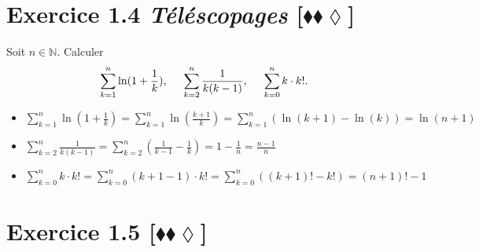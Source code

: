 \documentclass[10pt]{article}
\begin{document}

\section*{Exercice 1.4 \emph{Téléscopages} [$\blacklozenge\blacklozenge\lozenge$]}

\begin{tcolorbox}[enhanced, width=7in, center, size=fbox, fontupper=\large, drop shadow southwest]
    Soit $n\in\mathbb{N}$. Calculer
    \begin{equation*}
        \sum\limits^{n}_{k=1}{\ln(1+\frac{1}{k})}, \hspace{0.5cm} \sum\limits^{n}_{k=2}{\frac{1}{k(k-1)}}, \hspace{0.5cm} \sum\limits_{k=0}^{n}{k\cdot k!}.
    \end{equation*}
    \begin{itemize}
        \item $\sum\limits^{n}_{k=1}{\ln(1+\frac{1}{k})}=\sum\limits^n_{k=1}{\ln(\frac{k+1}{k})}=\sum\limits^n_{k=1}{(\ln(k+1)-\ln(k))}=\ln(n+1)$
        \item $\sum\limits^{n}_{k=2}{\frac{1}{k(k-1)}}=\sum\limits^n_{k=2}{(\frac{1}{k-1}-\frac{1}{k})}=1-\frac{1}{n}=\frac{n-1}{n}$
        \item $\sum\limits_{k=0}^{n}{k\cdot k!}=\sum\limits^n_{k=0}{(k+1-1)\cdot k!}=\sum\limits^n_{k=0}{((k+1)! - k!)}=(n+1)!-1$
    \end{itemize}
\end{tcolorbox}


\section*{Exercice 1.5 [$\blacklozenge\blacklozenge\lozenge$]}
\end{document}
